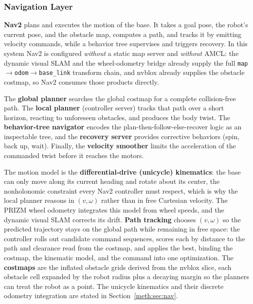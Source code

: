 \subsubsection{Navigation Layer}\label{sec:navigation}

\textbf{Nav2} plans and executes the motion of the base. It takes a goal pose, the robot's current pose, and the obstacle map, computes a path, and tracks it by emitting velocity commands, while a behavior tree supervises and triggers recovery. In this system Nav2 is configured \emph{without} a static map server and \emph{without} AMCL: the dynamic visual SLAM and the wheel-odometry bridge already supply the full \texttt{map}$\to$\texttt{odom}$\to$\texttt{base\_link} transform chain, and nvblox already supplies the obstacle costmap, so Nav2 consumes those products directly.

The \textbf{global planner} searches the global costmap for a complete collision-free path. The \textbf{local planner} (controller server) tracks that path over a short horizon, reacting to unforeseen obstacles, and produces the body twist. The \textbf{behavior-tree navigator} encodes the plan-then-follow-else-recover logic as an inspectable tree, and the \textbf{recovery server} provides corrective behaviors (spin, back up, wait). Finally, the \textbf{velocity smoother} limits the acceleration of the commanded twist before it reaches the motors.

The motion model is the \textbf{differential-drive (unicycle) kinematics}: the base can only move along its current heading and rotate about its center, the nonholonomic constraint every Nav2 controller must respect, which is why the local planner reasons in $(v,\omega)$ rather than in free Cartesian velocity. The PRIZM wheel odometry integrates this model from wheel speeds, and the dynamic visual SLAM corrects its drift. \textbf{Path tracking} chooses $(v,\omega)$ so the predicted trajectory stays on the global path while remaining in free space: the controller rolls out candidate command sequences, scores each by distance to the path and clearance read from the costmap, and applies the best, binding the costmap, the kinematic model, and the command into one optimization. The \textbf{costmaps} are the inflated obstacle grids derived from the nvblox slice, each obstacle cell expanded by the robot radius plus a decaying margin so the planners can treat the robot as a point. The unicycle kinematics and their discrete odometry integration are stated in Section~\ref{meth:sec:nav}.


